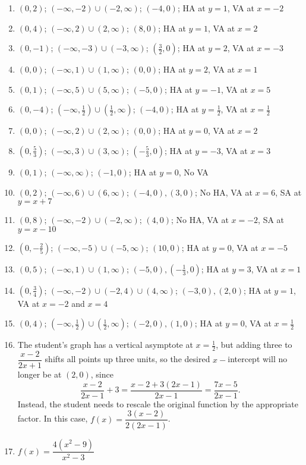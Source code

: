 \documentclass[12pt]{book}
\theoremstyle{definition}
\begin{document}
			\begin{enumerate}
				\item $(0,2)$; $(-\infty,-2)\cup(-2,\infty)$; $(-4,0)$; HA at $y=1$, VA at $x=-2$
				\item $(0,4)$; $(-\infty,2)\cup(2,\infty)$; $(8,0)$; HA at $y=1$, VA at $x=2$
				\item $(0,-1)$; $(-\infty,-3)\cup(-3,\infty)$; $(\frac{3}{2},0)$; HA at $y=2$, VA at $x=-3$
				\item $(0,0)$; $(-\infty,1)\cup(1,\infty)$; $(0,0)$; HA at $y=2$, VA at $x=1$
				\item $(0,1)$; $(-\infty,5)\cup(5,\infty)$; $(-5,0)$; HA at $y=-1$, VA at $x=5$
				\item $(0,-4)$; $(-\infty,\frac{1}{2})\cup(\frac{1}{2},\infty)$; $(-4,0)$; HA at $y=\frac{1}{2}$, VA at $x=\frac{1}{2}$
				\item $(0,0)$; $(-\infty,2)\cup(2,\infty)$; $(0,0)$; HA at $y=0$, VA at $x=2$
				\item $(0,\frac{5}{3})$; $(-\infty,3)\cup(3,\infty)$; $(-\frac{5}{3},0)$; HA at $y=-3$, VA at $x=3$
				\item $(0,1)$; $(-\infty,\infty)$; $(-1,0)$; HA at $y=0$, No VA
			\end{enumerate}
			\begin{enumerate}
			\setcounter{enumi}{9}
				\item $(0,2)$; $(-\infty,6)\cup(6,\infty)$; $(-4,0), (3,0)$; No HA, VA at $x=6$, SA at $y=x+7$
				\item $(0,8)$; $(-\infty,-2)\cup(-2,\infty)$; $(4,0)$; No HA, VA at $x=-2$, SA at $y=x-10$
				\item $(0,-\frac{2}{5})$; $(-\infty,-5)\cup(-5,\infty)$; $(10,0)$; HA at $y=0$, VA at $x=-5$
				\item $(0,5)$; $(-\infty,1)\cup(1,\infty)$; $(-5,0), (-\frac{1}{3},0)$; HA at $y=3$, VA at $x=1$
				\item $(0,\frac{3}{4})$; $(-\infty,-2)\cup(-2,4)\cup(4,\infty)$; $(-3,0), (2,0)$; HA at $y=1$, VA at $x=-2$ and $x=4$
				\item $(0,4)$; $(-\infty,\frac{1}{2})\cup(\frac{1}{2},\infty)$; $(-2,0), (1,0)$; HA at $y=0$, VA at $x=\frac{1}{2}$
			\end{enumerate}
			\begin{enumerate}
			\setcounter{enumi}{15}
				\item The student's graph has a vertical asymptote at $x=\frac{1}{2}$, but adding three to $\dfrac{x-2}{2x+1}$ shifts all points up three units, so the desired $x-$intercept will no longer be at $(2,0)$, since
				$$\dfrac{x-2}{2x-1}+3=\dfrac{x-2+3(2x-1)}{2x-1}=\dfrac{7x-5}{2x-1}.$$
				Instead, the student needs to rescale the original function by the appropriate factor.  In this case, $f(x)=\dfrac{3(x-2)}{2(2x-1)}$.
				\item $f(x)=\dfrac{4(x^2-9)}{x^2-3}$
			\end{enumerate}
\end{document}
